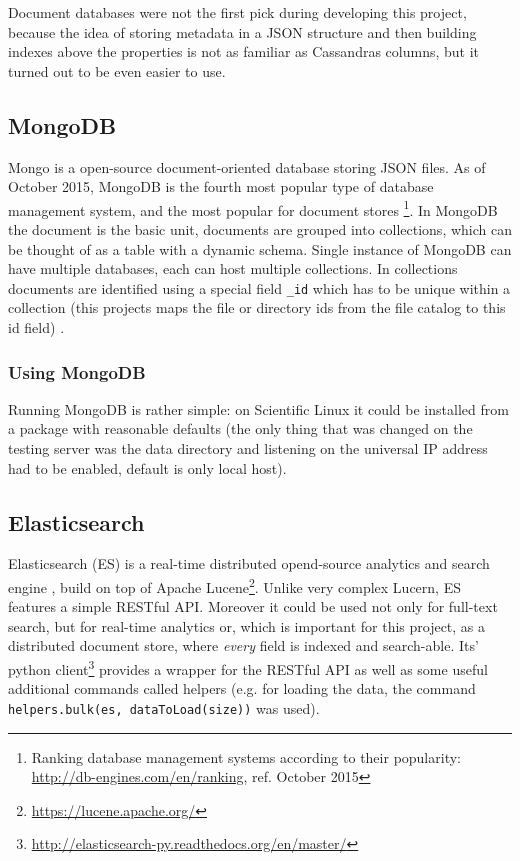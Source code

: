 Document databases were not the first pick during developing this project, because the idea of
storing metadata in a JSON structure and then building indexes above the properties is not as
familiar as Cassandras columns, but it turned out to be even easier to use.

\subsection{MongoDB}

Mongo is a open-source document-oriented database storing JSON files. As of October 2015, MongoDB is the fourth 
most popular type of database management system, and the most popular for document stores 
\footnote{Ranking database management systems according to their popularity: \url{http://db-engines.com/en/ranking}, ref. October 2015}. 
In MongoDB the document is the basic unit, documents are grouped into collections, which can be thought of as 
a table with a dynamic schema. Single instance of MongoDB can have multiple databases, each can host multiple 
collections. In collections documents are identified using a special field \texttt{\_id} which has to be unique
within a collection (this projects maps the file or directory ids from the file catalog to this id field) \cite{MongoBook}.

\subsubsection{Using MongoDB}

Running MongoDB is rather simple: on Scientific Linux it could be installed from a package with reasonable 
defaults (the only thing that was changed on the testing server was the data directory and listening on the 
universal IP address had to be enabled, default is only local host). 

\subsection{Elasticsearch}

Elasticsearch (ES) is a real-time distributed opend-source analytics and search engine \cite{ESBook}, 
build on top of Apache Lucene\footnote{\url{https://lucene.apache.org/}}. Unlike very complex Lucern, 
ES features a simple RESTful API. Moreover it could be used not only for full-text search, but for real-time
analytics or, which is important for this project, as a distributed document store, where \textit{every} field
is indexed and search-able. Its' python 
client\footnote{\url{http://elasticsearch-py.readthedocs.org/en/master/}} provides a wrapper for the RESTful API
as well as some useful additional commands called helpers (e.g. for loading the data, the command 
\texttt{helpers.bulk(es, dataToLoad(size))} was used).

